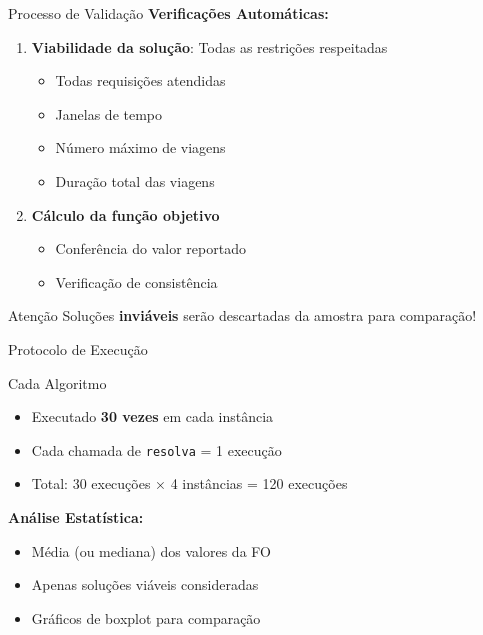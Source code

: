 \documentclass[10pt]{beamer}
\begin{document}
\begin{frame}{Processo de Validação}
    \textbf{Verificações Automáticas:}
    
    \vspace{0.3cm}
    
    \begin{enumerate}
        \item \textbf{Viabilidade da solução}: Todas as restrições respeitadas
        \begin{itemize}
            \item Todas requisições atendidas
            \item Janelas de tempo
            \item Número máximo de viagens
            \item Duração total das viagens
        \end{itemize}
        
        \vspace{0.3cm}
        
        \item \textbf{Cálculo da função objetivo}
        \begin{itemize}
            \item Conferência do valor reportado
            \item Verificação de consistência
        \end{itemize}
    \end{enumerate}
    
    \vspace{0.3cm}
    
    \begin{alertblock}{Atenção}
        Soluções \textbf{inviáveis} serão descartadas da amostra para comparação!
    \end{alertblock}
\end{frame}

\begin{frame}{Protocolo de Execução}
    \begin{block}{Cada Algoritmo}
        \begin{itemize}
            \item Executado \textbf{30 vezes} em cada instância
            \item Cada chamada de \texttt{resolva} = 1 execução
            \item Total: 30 execuções × 4 instâncias = 120 execuções
        \end{itemize}
    \end{block}
    
    \vspace{0.5cm}
    
    \textbf{Análise Estatística:}
    \begin{itemize}
        \item Média (ou mediana) dos valores da FO
        \item Apenas soluções viáveis consideradas
        \item Gráficos de boxplot para comparação
    \end{itemize}
\end{frame}
\end{document}
